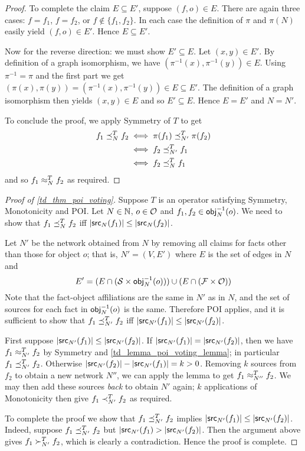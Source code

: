 \begin{proof}
To complete the claim $E \subseteq E'$, suppose $(f, o) \in E$. There are again
three cases: $f = f_1$, $f = f_2$, or $f \notin \{f_1,f_2\}$. In each case the
definition of $\pi$ and $\pi(N)$ easily yield $(f, o) \in E'$. Hence $E
\subseteq E'$.

Now for the reverse direction: we must show $E' \subseteq E$. Let $(x, y) \in
E'$.  By definition of a graph isomorphism, we have $(\pi^{-1}(x), \pi^{-1}(y))
\in E$.  Using $\pi^{-1} = \pi$ and the first part we get $(\pi(x), \pi(y)) =
(\pi^{-1}(x), \pi^{-1}(y)) \in E \subseteq E'$. The definition of a graph
isomorphism then yields $(x, y) \in E$ and so $E' \subseteq E$. Hence $E = E'$
and $N = N'$.

To conclude the proof, we apply Symmetry of $T$ to get
\begin{align*}
    f_1 \preceq_N^T f_2
    & \iff \pi(f_1) \preceq_{N'}^T \pi(f_2) \\
    & \iff f_2 \preceq_{N'}^T f_1 \\
    & \iff f_2 \preceq_N^T f_1
\end{align*}
and so $f_1 \approx_N^T f_2$ as required.
\end{proof}

\begin{proof}[Proof of \cref{td_thm_poi_voting}]

Suppose $T$ is an operator satisfying Symmetry, Monotonicity and POI. Let $N
\in \mathbb{N}$, $o \in \mathcal{O}$ and $f_1, f_2 \in \mathsf{obj}_N^{-1}(o)$. We need to show that
$f_1 \preceq_N^T f_2$ iff $|\mathsf{src}_N(f_1)| \le |\mathsf{src}_N(f_2)|$.

Let $N'$ be the network obtained from $N$ by removing all claims for facts
other than those for object $o$; that is, $N' = (V, E')$ where $E$ is the set
of edges in $N$ and
\[
    E' = (E \cap (\mathcal{S} \times \mathsf{obj}_N^{-1}(o))) \cup (E \cap (\mathcal{F} \times \mathcal{O}))
\]
Note that the fact-object affiliations are the same in $N'$ as in $N$, and the
set of sources for each fact in $\mathsf{obj}_N^{-1}(o)$ is the same. Therefore POI
applies, and it is sufficient to show that
$f_1 \preceq_{N'}^T f_2$ iff $|\mathsf{src}_{N'}(f_1)| \le |\mathsf{src}_{N'}(f_2)|$.

First suppose $|\mathsf{src}_{N'}(f_1)| \le |\mathsf{src}_{N'}(f_2)|$. If $|\mathsf{src}_{N'}(f_1)| =
|\mathsf{src}_{N'}(f_2)|$, then we have $f_1 \approx_{N'}^T f_2$ by Symmetry and
\cref{td_lemma_poi_voting_lemma}; in particular $f_1 \preceq_{N'}^T f_2$. Otherwise
$|\mathsf{src}_{N'}(f_2)| - |\mathsf{src}_{N'}(f_1)| = k > 0$. Removing $k$ sources from $f_2$
to obtain a new network $N''$, we can apply the lemma to get $f_1 \approx_{N''}^T
f_2$. We may then add these sources \emph{back} to obtain $N'$ again; $k$
applications of Monotonicity then give $f_1 \prec_{N'}^T f_2$ as required.

To complete the proof we show that $f_1 \preceq_{N'}^T f_2$ implies
$|\mathsf{src}_{N'}(f_1)| \le |\mathsf{src}_{N'}(f_2)|$. Indeed, suppose $f_1  \preceq_{N'}^T f_2$
but $|\mathsf{src}_{N'}(f_1) > |\mathsf{src}_{N'}(f_2)|$. Then the argument above gives $f_1
\succ_{N'}^T f_2$, which is clearly a contradiction. Hence the proof is
complete.
\end{proof}

